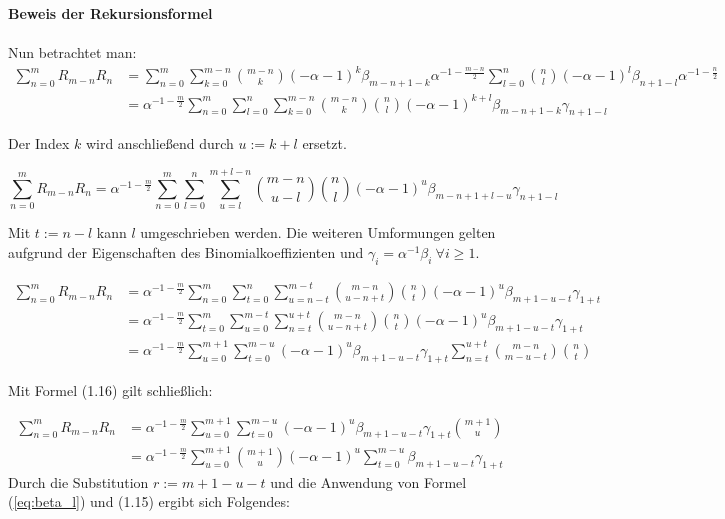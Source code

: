 \documentclass[a4paper, 11pt]{scrreprt}
\newcommand{\student}[1]{\marginnote{{\normalfont\bf #1}}}
\begin{document}
\student{Andreas}
\textbf{Beweis der Rekursionsformel}\\\\
Nun betrachtet man:
\begin{align*}
\sum_{n=0}^m R_{m-n} R_n 
&= \sum_{n=0}^m \sum_{k=0}^{m-n} \binom{m-n}{k} (-\alpha -1)^k \beta_{m-n+1-k} \alpha^{-1-\frac{m-n}{2}} \sum_{l=0}^n \binom{n}{l} (-\alpha -1)^l \beta_{n+1-l} \alpha^{-1-\frac{n}{2}} \\
&= \alpha^{-1-\frac{m}{2}} \sum_{n=0}^m \sum_{l=0}^n \sum_{k=0}^{m-n} \binom{m-n}{k}  \binom{n}{l} (-\alpha -1)^{k+l} \beta_{m-n+1-k} \gamma_{n+1-l}	
\end{align*}

Der Index $k$ wird anschließend durch $u:=k+l$ ersetzt.

\[\sum_{n=0}^m R_{m-n} R_n = \alpha^{-1-\frac{m}{2}} \sum_{n=0}^m \sum_{l=0}^n \sum_{u=l}^{m+l-n} \binom{m-n}{u-l}  \binom{n}{l} (-\alpha -1)^u \beta_{m-n+1+l-u} \gamma_{n+1-l}\]

Mit $t:=n-l$ kann $l$ umgeschrieben werden. Die weiteren Umformungen gelten aufgrund der Eigenschaften des Binomialkoeffizienten und $ \gamma_i=\alpha^{-1} \beta_i ~\forall i\geq1$.

\begin{align*}
\sum_{n=0}^m R_{m-n} R_n 
&= \alpha^{-1-\frac{m}{2}} \sum_{n=0}^m \sum_{t=0}^n \sum_{u=n-t}^{m-t} \binom{m-n}{u-n+t}  \binom{n}{t} (-\alpha -1)^u \beta_{m+1-u-t} \gamma_{1+t} \\
&= \alpha^{-1-\frac{m}{2}} \sum_{t=0}^m \sum_{u=0}^{m-t} \sum_{n=t}^{u+t} \binom{m-n}{u-n+t}  \binom{n}{t} (-\alpha -1)^u \beta_{m+1-u-t} \gamma_{1+t} \\
&= \alpha^{-1-\frac{m}{2}} \sum_{u=0}^{m+1} \sum_{t=0}^{m-u} (-\alpha -1)^u \beta_{m+1-u-t} \gamma_{1+t} \sum_{n=t}^{u+t} \binom{m-n}{m-u-t}  \binom{n}{t}
\end{align*}

Mit Formel (1.16) gilt schließlich:

\begin{align*}
\sum_{n=0}^m R_{m-n} R_n 
&= \alpha^{-1-\frac{m}{2}} \sum_{u=0}^{m+1} \sum_{t=0}^{m-u} (-\alpha -1)^u \beta_{m+1-u-t} \gamma_{1+t} \binom{m+1}{u} \\
&= \alpha^{-1-\frac{m}{2}} \sum_{u=0}^{m+1} \binom{m+1}{u} (-\alpha -1)^u \sum_{t=0}^{m-u} \beta_{m+1-u-t} \gamma_{1+t}
\end{align*}
\student{Manuela}
Durch die Substitution $r := m+1-u-t$ und die Anwendung von Formel (\ref{eq:beta_l}) und (1.15) ergibt sich Folgendes:
\end{document}
